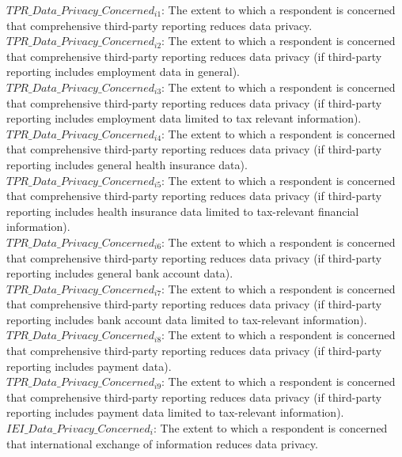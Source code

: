 \documentclass[11pt]{article}
\begin{document}
$TPR\_Data\_Privacy\_Concerned_{i1}$: The extent to which a respondent is concerned that comprehensive third-party reporting reduces data privacy. \\[0.15em]
$TPR\_Data\_Privacy\_Concerned_{i2}$: The extent to which a respondent is concerned that comprehensive third-party reporting reduces data privacy (if third-party reporting includes employment data in general). \\[0.15em]
$TPR\_Data\_Privacy\_Concerned_{i3}$: The extent to which a respondent is concerned that comprehensive third-party reporting reduces data privacy (if third-party reporting includes employment data limited to tax relevant information).\\[0.15em]
$TPR\_Data\_Privacy\_Concerned_{i4}$: The extent to which a respondent is concerned that comprehensive third-party reporting reduces data privacy (if third-party reporting includes general health insurance data).\\[0.15em]
$TPR\_Data\_Privacy\_Concerned_{i5}$: The extent to which a respondent is concerned that comprehensive third-party reporting reduces data privacy (if third-party reporting includes health insurance data limited to tax-relevant financial information).\\[0.15em]
$TPR\_Data\_Privacy\_Concerned_{i6}$: The extent to which a respondent is concerned that comprehensive third-party reporting reduces data privacy (if third-party reporting includes general bank account data).\\[0.15em]
$TPR\_Data\_Privacy\_Concerned_{i7}$: The extent to which a respondent is concerned that comprehensive third-party reporting reduces data privacy (if third-party reporting includes bank account data limited to tax-relevant information).\\[0.15em]
$TPR\_Data\_Privacy\_Concerned_{i8}$: The extent to which a respondent is concerned that comprehensive third-party reporting reduces data privacy (if third-party reporting includes payment data).\\[0.15em]
$TPR\_Data\_Privacy\_Concerned_{i9}$: The extent to which a respondent is concerned that comprehensive third-party reporting reduces data privacy (if third-party reporting includes payment data limited to tax-relevant information).\\[0.15em]
$IEI\_Data\_Privacy\_Concerned_i$: The extent to which a respondent is concerned that international exchange of information reduces data privacy. \\[0.15em]
\\
\end{document}
